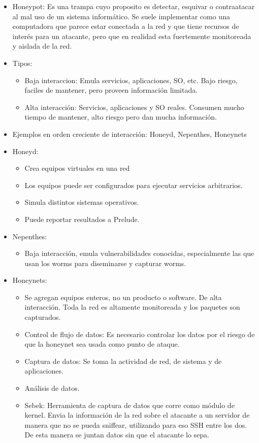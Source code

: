 \begin{itemize}
\item Honeypot: Es una trampa cuyo proposito es detectar, esquivar o contraatacar al mal uso de un sistema informático.
	Se suele implementar como una computadora que parece estar conectada a la red y que tiene recursos de interés para un
	atacante, pero que en realidad esta fuertemente monitoreada y aislada de la red.
\item Tipos: \begin{itemize}
		\item Baja interaccion: Emula servicios, aplicaciones, SO, etc. Bajo riesgo, faciles de mantener, pero proveen información limitada.
		\item Alta interacción: Servicios, aplicaciones y SO reales. Consumen mucho tiempo de mantener, alto riesgo pero dan mucha información.
	\end{itemize}
\item Ejemplos en orden creciente de interacción: Honeyd, Nepenthes, Honeynets
\item Honeyd: \begin{itemize}
	\item Crea equipos virtuales en una red
	\item Los equipos puede ser configurados para ejecutar servicios arbitrarios.
	\item Simula distintos sistemas operativos.
	\item Puede reportar resultados a Prelude.
	\end{itemize}
\item Nepenthes:\begin{itemize}
	\item Baja interacción, emula vulnerabilidades conocidas, especialmente las que usan los worms para diseminarse y 
	capturar worms.
	\end{itemize}
\item Honeynets: \begin{itemize}
	\item Se agregan equipos enteros, no un producto o software. De alta interacción. Toda la red es altamente monitoreada y
		los paquetes son capturados.
	\item Control de flujo de datos:  Es necesario controlar los datos por el riesgo de que la honeynet sea usada como punto de ataque.
	\item Captura de datos: Se toma la actividad de red, de sistema y de aplicaciones.
	\item Análisis de datos.
	\item Sebek: Herramienta de captura de datos que corre como módulo de kernel. Envia la información de la red sobre el atacante
		a un servidor de manera que no se pueda sniffear, utilizando para eso SSH entre los dos. De esta manera se juntan datos sin
		que el atacante lo sepa.
	\end{itemize}
\end{itemize}

